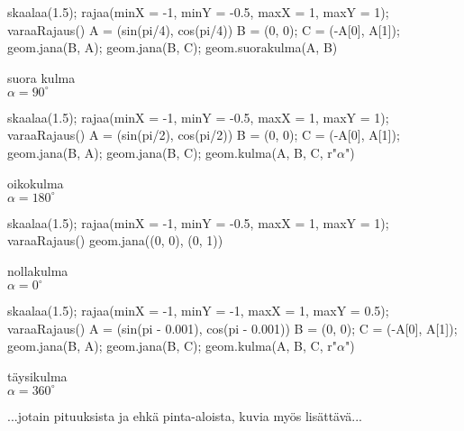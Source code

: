 \begin{minipage}{3cm}
\begin{kuva}
skaalaa(1.5); rajaa(minX = -1, minY = -0.5, maxX = 1, maxY = 1); varaaRajaus()
A = (sin(pi/4), cos(pi/4))
B = (0, 0); C = (-A[0], A[1]); geom.jana(B, A); geom.jana(B, C); geom.suorakulma(A, B)
\end{kuva}
\centering suora kulma \\$\alpha = 90^\circ$
\end{minipage}
\begin{minipage}{3cm}
\begin{kuva}
skaalaa(1.5); rajaa(minX = -1, minY = -0.5, maxX = 1, maxY = 1); varaaRajaus()
A = (sin(pi/2), cos(pi/2))
B = (0, 0); C = (-A[0], A[1]); geom.jana(B, A); geom.jana(B, C); geom.kulma(A, B, C, r"$\alpha$")
\end{kuva}
\centering oikokulma \\$\alpha = 180^\circ$
\end{minipage}
\begin{minipage}{3cm}
\begin{kuva}
skaalaa(1.5); rajaa(minX = -1, minY = -0.5, maxX = 1, maxY = 1); varaaRajaus()
geom.jana((0, 0), (0, 1))
\end{kuva}
\centering nollakulma \\$\alpha = 0^\circ$
\end{minipage}
\begin{minipage}{3cm}
\begin{kuva}
skaalaa(1.5); rajaa(minX = -1, minY = -1, maxX = 1, maxY = 0.5); varaaRajaus()
A = (sin(pi - 0.001), cos(pi - 0.001))
B = (0, 0); C = (-A[0], A[1]); geom.jana(B, A); geom.jana(B, C); geom.kulma(A, B, C, r"$\alpha$")
\end{kuva}
\centering täysikulma \\$\alpha = 360^\circ$
\end{minipage}

...jotain pituuksista ja ehkä pinta-aloista, kuvia myös lisättävä...
